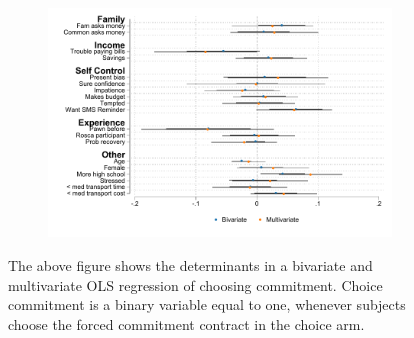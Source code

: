 \begin{figure}[H]
    \caption{Determinants of choice}
    \label{determinants_choose}
    \begin{center}
    \begin{subfigure}{0.6\textwidth}
        \centering
        \includegraphics[width=\textwidth]{Figuras/determinants_choose_commitment.pdf}
    \end{subfigure}
    \end{center}
      \scriptsize

      The above figure shows the determinants in a bivariate and multivariate OLS regression of choosing commitment. Choice commitment is a binary variable equal to one, whenever subjects choose the forced commitment contract in the choice arm. 
\end{figure}



